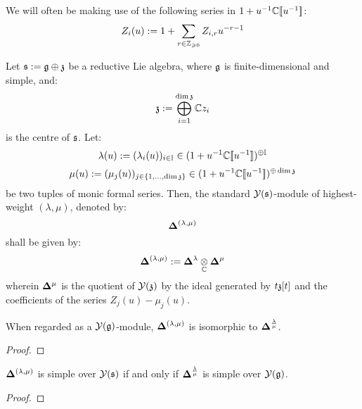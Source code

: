         \begin{convention}
            We will often be making use of the following series in $1 + u^{-1}\mathbb{C}[\![u^{-1}]\!]$:
                $$Z_i(u) := 1 + \sum_{r \in \mathbb{Z}_{\geqslant 0}} Z_{i, r} u^{-r - 1}$$
        \end{convention}
        \begin{definition} \label{def: standard_modules_for_finite_untwisted_yangians_of_reductive_lie_algebras}
            Let $\mathfrak{s} := \mathfrak{g} \oplus \mathfrak{z}$ be a reductive Lie algebra, where $\mathfrak{g}$ is finite-dimensional and simple, and:
                $$\mathfrak{z} := \bigoplus_{i = 1}^{\dim \mathfrak{z}} \mathbb{C} z_i$$
            is the centre of $\mathfrak{s}$. Let:
                $$\lambda(u) := ( \lambda_i(u) )_{i \in \mathbb{I}} \in (1 + u^{-1} \mathbb{C}[\![u^{-1}]\!])^{\oplus \mathbb{I}}$$
                $$\mu(u) := ( \mu_j(u) )_{j \in \{1, ..., \dim \mathfrak{z}\}} \in (1 + u^{-1} \mathbb{C}[\![u^{-1}]\!])^{\oplus \dim \mathfrak{z}}$$
            be two tuples of monic formal series. Then, the standard $\mathcal{Y}(\mathfrak{s})$-module of highest-weight $(\lambda, \mu)$, denoted by:
                $$\mathbf{ \Delta }^{(\lambda, \mu)}$$
            shall be given by:
                $$\qstandard^{(\lambda, \mu)} := \qstandard^{\lambda} \tensor_{\bbC} \qstandard^{\mu}$$
            wherein $\mathbf{ \Delta }^{\mu}$ is the quotient of $\mathcal{Y}(\mathfrak{z})$ by the ideal generated by $t\mathfrak{z}[t]$ and the coefficients of the series $Z_j(u) - \mu_j(u)$.
        \end{definition}
        
        \begin{proposition}
            When regarded as a $\mathcal{Y}(\mathfrak{g})$-module, $\mathbf{ \Delta }^{(\lambda, \mu)}$ is isomorphic to $\mathbf{ \Delta }^{\frac{\lambda}{\mu}}$. 
        \end{proposition}
            \begin{proof}
                
            \end{proof}
        \begin{corollary}
            $\mathbf{ \Delta }^{(\lambda, \mu)}$ is simple over $\mathcal{Y}(\mathfrak{s})$ if and only if $\mathbf{ \Delta }^{\frac{\lambda}{\mu}}$ is simple over $\mathcal{Y}(\mathfrak{g})$. 
        \end{corollary}
            \begin{proof}
                
            \end{proof}

